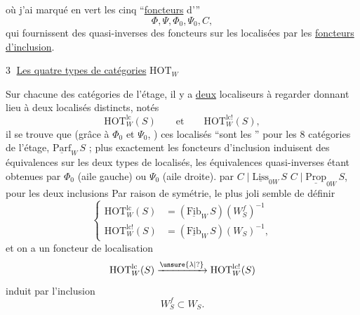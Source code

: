 où j'ai  marqué en vert les cinq ``\uline{foncteurs} d'\uline{}''
\[
\Phi,\Psi,\Phi_0,\Psi_0,C,
\]
qui fournissent des quasi-inverses des foncteurs sur
les  localisées  par les \uline{foncteurs d'inclusion}.

\textcircled{3} \uline{Les quatre types de catégories} $\mathrm{HOT}_W$

Sur chacune des catégories de l'étage, il y a
\uline{deux} localiseurs à regarder
donnant lieu à deux localisés distincts, notés
\[
\mathrm{HOT}_W^{\mathrm{lc}}(S)\qquad\text{et}\qquad\mathrm{HOT}_W^{\mathrm{lc}!}(S),
\]
il se trouve que (grâce à $\Phi_0$ et $\Psi_0$, ) ces localisés
``sont les '' pour les 8 catégories de l'étage,
 $\underline{\mathrm{Parf}}_W\,S$ ; plus exactement les foncteurs
d'inclusion 
induisent des équivalences sur les
deux types de localisés, les équivalences quasi-inverses étant obtenues par $\Phi_0$ (aile gauche) ou
$\Psi_0$ (aile droite). 
 par $C\mid\underline{\mathrm{Liss}}_{0W}\,S$
$C\mid\underline{\mathrm{Prop}}_{0W}\,S$, pour les deux inclusions
Par raison de symétrie, le plus joli semble de
définir
\[
\left\{\begin{aligned}
\mathrm{HOT}_W^{\mathrm{lc}}(S)&=(\underline{\mathrm{Fib}}_W\,S)(W_S^f)^{-1}\\
\mathrm{HOT}_W^{\mathrm{lc}!}(S)&=(\underline{\mathrm{Fib}}_W\,S)(W_S)^{-1},
\end{aligned}\right.
\]
et on a un foncteur de localisation
\[
\mathrm{HOT}_W^{\mathrm{lc}}(S)\xrightarrow{\unsure{\lambda|{?}}}\mathrm{HOT}_W^{\mathrm{lc}!}(S)
\]
induit par l'inclusion
\[
W_S^f\subset W_S .
\]
